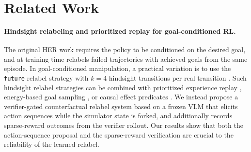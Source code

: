 \documentclass{article}
\begin{document}
\section{Related Work}
\label{sec:related}

\paragraph{Hindsight relabeling and prioritized replay for
goal-conditioned RL.}
The original HER work \citep{andrychowicz2017her} requires the
policy to be conditioned on the desired goal, and at training time
relabels failed trajectories with achieved goals from the same
episode. In goal-conditioned manipulation, a practical variation is
to use the \texttt{future} relabel strategy with $k\!=\!4$ hindsight
transitions per real transition \citep{plappert2018multigoal}. Such
hindsight relabel strategies can be combined with prioritized
experience replay \citep{schaul2016per}, energy-based goal sampling
\citep{zhao2018energy}, or causal effect predicates
\citep{sayar2023cebp,urpi2024caiac}. We instead propose a
verifier-gated counterfactual relabel system based on a frozen VLM
that elicits action sequences while the simulator state is forked,
and additionally records sparse-reward outcomes from the verifier
rollout. Our results show that both the action-sequence proposal
and the sparse-reward verification are crucial to the reliability of
the learned relabel.
\end{document}
